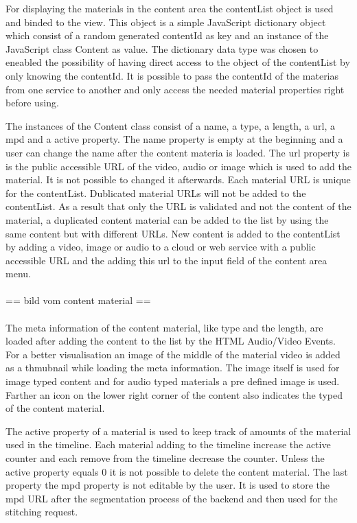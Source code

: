 \documentclass[conference]{IEEEtran}
\begin{document}
For displaying the materials in the content area the contentList object is used and binded to the view. This object is a simple JavaScript dictionary object which consist of a random generated contentId as key and an instance of the JavaScript class Content as value. The dictionary data type was chosen to eneabled the possibility of having direct access to the object of the contentList by only knowing the contentId. It is possible to pass the contentId of the materias from one service to another and only access the needed material properties right before using.

The instances of the Content class consist of a name, a type, a length, a url, a mpd and a active property. The name property is empty at the beginning and a user can change the name after the content materia is loaded. The url property is is the public accessible URL of the video, audio or image which is used to add the material. It is not possible to changed it afterwards. Each material URL is unique for the contentList. Dublicated material URLs will not be added to the contentList. As a result that only the URL is validated and not the content of the material, a duplicated content material can be added to the list by using the same content but with different URLs. New content is added to the contentList by adding a video, image or audio to a cloud or web service with a public accessible URL and the adding this url to the input field of the content area menu.\\
\\
== bild vom content material ==\\
\\
The meta information of the content material, like type and the length, are loaded after adding the content to the list by the HTML Audio/Video Events. For a better visualisation an image of the middle of the material video is added as a thmubnail while loading the meta information. The image itself is used for image typed content and for audio typed materials a pre defined image is used. Farther an icon on the lower right corner of the content also indicates the typed of the content material.

The active property of a material is used to keep track of amounts of the material used in the timeline. Each material adding to the timeline increase the active counter and each remove from the timeline decrease the counter. Unless the active property equals 0 it is not possible to delete the content material. The last property the mpd property is not editable by the user. It is used to store the mpd URL after the segmentation process of the backend and then used for the stitching request.
\end{document}
